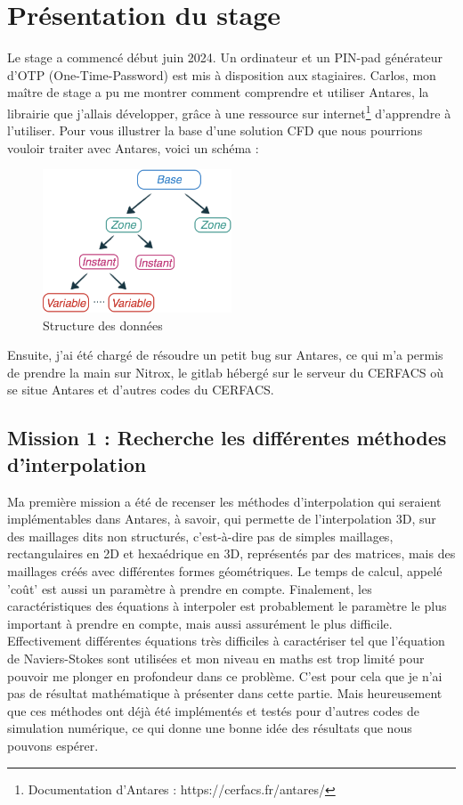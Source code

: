 \chapter{Présentation du stage}

Le stage a commencé début juin 2024.
Un ordinateur et un PIN-pad générateur d'OTP (One-Time-Password) est mis à disposition aux stagiaires.
Carlos, mon maître de stage a pu me montrer comment comprendre et utiliser Antares, la librairie que j'allais développer, grâce à
une ressource sur internet\footnote{Documentation d'Antares : https://cerfacs.fr/antares/} d'apprendre à l'utiliser.
Pour vous illustrer la base d'une solution CFD que nous pourrions vouloir traiter avec Antares, voici un schéma :

\begin{figure}[ht!]
    \centering
    \includegraphics[width=0.5\textwidth]{images/data_structure_1.png}
    \caption{Structure des données} %
\end{figure}


Ensuite, j'ai été chargé de résoudre un petit bug sur Antares, ce qui m'a permis de prendre la main sur Nitrox, le gitlab hébergé sur le serveur du CERFACS où se situe Antares et d'autres codes du CERFACS.

\section{Mission 1 : Recherche les différentes méthodes d'interpolation}
Ma première mission a été de recenser les méthodes d'interpolation qui seraient implémentables dans Antares, à savoir, qui permette de l'interpolation 3D, sur des maillages dits non structurés, c'est-à-dire pas de simples maillages, rectangulaires en 2D et hexaédrique en 3D, représentés par des matrices, mais des maillages créés avec différentes formes géométriques.
Le temps de calcul, appelé 'coût' est aussi un paramètre à prendre en compte.
Finalement, les caractéristiques des équations à interpoler est probablement le paramètre le plus important à prendre en compte, mais aussi assurément le plus difficile. Effectivement différentes équations très difficiles à caractériser tel que l'équation de Naviers-Stokes sont utilisées et mon niveau en maths est trop limité pour pouvoir me plonger en profondeur dans ce problème. C'est pour cela que je n'ai pas de résultat mathématique à présenter dans cette partie. Mais heureusement que ces méthodes ont déjà été implémentés et testés pour d'autres codes de simulation numérique, ce qui donne une bonne idée des résultats que nous pouvons espérer.

